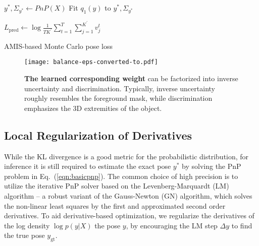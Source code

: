 \documentclass[10pt,twocolumn,letterpaper]{article}
\begin{document}
\begin{algorithm}[t]
\DontPrintSemicolon
  $y^\ast, \Sigma_{y^\ast} \gets \mathit{PnP}(X)$ 
  Fit $q_1(y)$ to $y^\ast, \Sigma_{y^\ast}$ 
  
  $L_\text{pred} \gets \log \frac{1}{T K^\prime} \sum_{t=1}^{T} \sum_{j=1}^{K^\prime} v_j^t$

\caption{AMIS-based Monte Carlo pose loss}
\label{amisalg}
\end{algorithm}

\begin{figure}[t]
\vspace{-1.0ex}
\begin{center}
    \texttt{[image: balance-eps-converted-to.pdf]}
\end{center}
\vspace{-1.2ex}
\caption{\textbf{The learned corresponding weight} can be factorized into inverse uncertainty and discrimination. 
Typically, inverse uncertainty roughly resembles the foreground mask, while discrimination emphasizes the 3D extremities of the object.
}
\label{fig:balance}
\end{figure}

\subsection{Local Regularization of Derivatives} \label{localreg}

While the KL divergence is a good metric for the probabilistic distribution, for inference it is still required to estimate the exact pose $y^\ast$ by solving the PnP problem in Eq.~(\ref{eqn:basicpnp}). The common choice of high precision is to utilize the iterative PnP solver based on the 
Levenberg-Marquardt (LM) algorithm -- a robust variant of the Gauss-Newton (GN) algorithm, which solves the non-linear least squares by the first and approximated second order derivatives. 
To aid derivative-based optimization, we regularize the derivatives of the log density $\log p(y|X)$ \wrt the pose $y$, by encouraging the LM step $\Delta y$ to find the true pose $y_\text{gt}$.
\end{document}
